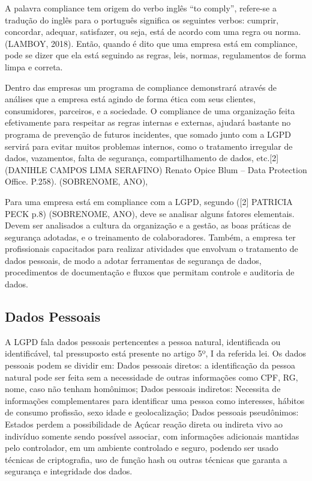 \documentclass[
	12pt,				%
	openright,			%
	oneside,			%
	a4paper,			%
	english,			%
	french,				%
	spanish,			%
	brazil,				%
	]{abntex2}
\begin{document}
A palavra compliance tem origem do verbo inglês “to comply”, refere-se a tradução do inglês para o português significa os seguintes verbos: cumprir, concordar, adequar, satisfazer, ou seja, está de acordo com uma regra ou norma. (LAMBOY, 2018). Então, quando é dito que uma empresa está em compliance, pode se dizer que ela está seguindo as regras, leis, normas, regulamentos de forma limpa e correta.

Dentro das empresas um programa de compliance demonstrará através de análises que a empresa está agindo de forma ética com seus clientes, consumidores, parceiros, e a sociedade. O compliance de uma organização feita efetivamente para respeitar as regras internas e externas, ajudará bastante no programa de prevenção de futuros incidentes, que somado junto com a LGPD servirá para evitar muitos problemas internos, como o tratamento irregular de dados, vazamentos, falta de segurança, compartilhamento de dados, etc.[2] (DANIHLE CAMPOS LIMA SERAFINO) Renato Opice Blum – Data Protection Office. P.258). (SOBRENOME, ANO),

Para uma empresa está em compliance com a LGPD, segundo ([2] PATRICIA PECK p.8) (SOBRENOME, ANO), deve se analisar alguns fatores elementais. Devem ser analisados a cultura da organização e a gestão, as boas práticas de segurança adotadas, e o treinamento de colaboradores. Também, a empresa ter profissionais capacitados para realizar atividades que envolvam o tratamento de dados pessoais, de modo a adotar ferramentas de segurança de dados, procedimentos de documentação e fluxos que permitam controle e auditoria de dados. 

\subsection{Dados Pessoais}

A LGPD fala dados pessoais pertencentes a pessoa natural, identificada ou identificável, tal pressuposto está presente no artigo 5º, I da referida lei.
Os dados pessoais podem se dividir em:
Dados pessoais diretos: a identificação da pessoa natural pode ser feita sem a necessidade de outras informações como CPF, RG, nome, caso não tenham homônimos;
Dados pessoais indiretos: Necessita de informações complementares para identificar uma pessoa como interesses, hábitos de consumo profissão, sexo idade e geolocalização;
Dados pessoais pseudônimos: Estados perdem a possibilidade de Açúcar reação direta ou indireta vivo ao indivíduo somente sendo possível associar, com informações adicionais mantidas pelo controlador, em um ambiente controlado e seguro, podendo ser usado técnicas de criptografia, uso de função hash ou outras técnicas que garanta a segurança e integridade dos dados.
\end{document}

